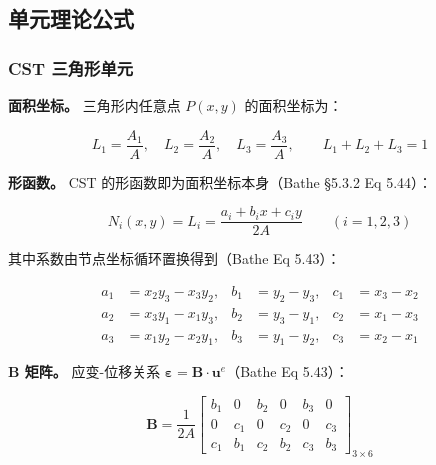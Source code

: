 \documentclass[12pt,a4paper]{ctexart}
\begin{document}
\subsection{单元理论公式}

\subsubsection{CST 三角形单元}

\textbf{面积坐标。} 三角形内任意点 $P(x,y)$ 的面积坐标为：

\begin{equation}\label{eq:cst-area}
L_1 = \frac{A_1}{A},\quad L_2 = \frac{A_2}{A},\quad L_3 = \frac{A_3}{A},
\qquad L_1 + L_2 + L_3 = 1
\end{equation}

\textbf{形函数。} CST 的形函数即为面积坐标本身（Bathe \S5.3.2 Eq 5.44）：

\begin{equation}\label{eq:cst-N}
N_i(x,y) = L_i = \frac{a_i + b_i x + c_i y}{2A}\qquad (i=1,2,3)
\end{equation}

其中系数由节点坐标循环置换得到（Bathe Eq 5.43）：

\begin{equation}\label{eq:cst-coeff}
\begin{aligned}
a_1 &= x_2 y_3 - x_3 y_2, & b_1 &= y_2 - y_3, & c_1 &= x_3 - x_2 \\
a_2 &= x_3 y_1 - x_1 y_3, & b_2 &= y_3 - y_1, & c_2 &= x_1 - x_3 \\
a_3 &= x_1 y_2 - x_2 y_1, & b_3 &= y_1 - y_2, & c_3 &= x_2 - x_1
\end{aligned}
\end{equation}

\textbf{B 矩阵。} 应变-位移关系 $\bm{\varepsilon} = \mathbf{B}\cdot\mathbf{u}^e$（Bathe Eq 5.43）：

\begin{equation}\label{eq:cst-B}
\mathbf{B} = \frac{1}{2A}
\begin{bmatrix}
b_1 & 0   & b_2 & 0   & b_3 & 0   \\
0   & c_1 & 0   & c_2 & 0   & c_3 \\
c_1 & b_1 & c_2 & b_2 & c_3 & b_3
\end{bmatrix}_{3\times 6}
\end{equation}
\end{document}
